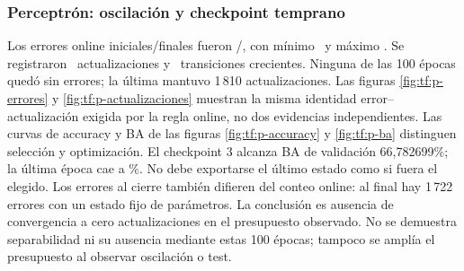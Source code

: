 \subsubsection{Perceptrón: oscilación y checkpoint temprano}
Los errores online iniciales/finales fueron \TFErroresInicialesP/\TFErroresFinalesP, con mínimo \TFMinErroresP\ y máximo \TFMaxErroresP. Se registraron \TFActualizacionesP\ actualizaciones y \TFSubidasP\ transiciones crecientes. Ninguna de las 100 épocas quedó sin errores; la última mantuvo 1\,810 actualizaciones. Las figuras \ref{fig:tf:p-errores} y \ref{fig:tf:p-actualizaciones} muestran la misma identidad error--actualización exigida por la regla online, no dos evidencias independientes.
Las curvas de accuracy y BA de las figuras \ref{fig:tf:p-accuracy} y \ref{fig:tf:p-ba} distinguen selección y optimización. El checkpoint 3 alcanza BA de validación 66,782699\%; la última época cae a \TFBAPUltima\%. No debe exportarse el último estado como si fuera el elegido. Los errores al cierre también difieren del conteo online: al final hay 1\,722 errores con un estado fijo de parámetros.
La conclusión es ausencia de convergencia a cero actualizaciones en el presupuesto observado. No se demuestra separabilidad ni su ausencia mediante estas 100 épocas; tampoco se amplía el presupuesto al observar oscilación o test.

